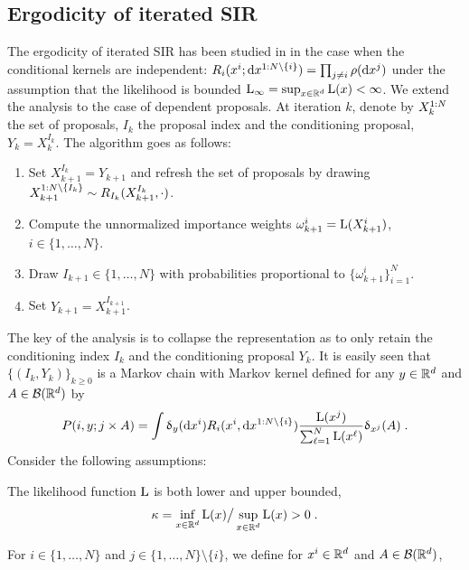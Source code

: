 \subsection{Ergodicity of iterated SIR}
\label{sup:sec:ergodicity}
The ergodicity of iterated SIR has been studied in \cite{andrieu2018uniform} in the case when the conditional kernels are independent: $R_i(x^i; \mathrm{d} x^{1:N \setminus \{i\}})= \prod_{j \neq i} \rho(\mathrm{d} x^j)$ under the assumption that the likelihood is bounded $\mathrm{L}_\infty= \sup_{x \in \mathbb{R}^d} \mathrm{L}(x) < \infty$. We extend the analysis to the case of dependent proposals. At iteration $k$, denote by $X_k^{1:N}$ the set of proposals, $I_k$ the proposal index and the conditioning proposal, $Y_k=X_k^{I_k}$. The algorithm goes as follows:
\begin{enumerate}
\item Set $X_{k+1}^{I_k}= Y_{k+1}$ and refresh the set of proposals by drawing $X_{k+1}^{1:N \setminus \{I_k\}} \sim R_{I_k}(X_{k+1}^{I_k},\cdot)$.
\item Compute the unnormalized importance weights $\omega_{k+1}^i= \mathrm{L}(X_{k+1}^i)$, $i \in \{1,\dots,N\}$.
\item Draw $I_{k+1} \in \{1,\dots,N\}$ with probabilities proportional to $\{\omega_{k+1}^i \}_{i=1}^N$.
\item Set $Y_{k+1}= X_{k+1}^{I_{k+1}}$.
\end{enumerate}
The key of the analysis is to collapse the representation as to  only retain the conditioning index $I_k$ and the conditioning proposal $Y_k$. It is easily seen that $\{(I_k,Y_k) \}_{k \geq 0}$ is a Markov chain with Markov kernel defined for any $y \in \mathbb{R}^d$ and $A \in \mathcal{B}(\mathbb{R}^d)$ by
\begin{equation}
\label{eq:kernel-marginal}
P(i,y; j \times A)=  \int \updelta_y(\mathrm{d} x^i) R_i(x^i, \mathrm{d} x^{1:N \setminus \{i\}}) \frac{\mathrm{L}(x^j)}{\sum_{\ell=1}^N \mathrm{L}(x^\ell)} \updelta_{x^j}(A) \;.
\end{equation}
Consider the following assumptions:
\begin{assumption}
\label{assum:likelihood-bounded}
The likelihood function $\mathrm{L}$ is both lower and upper bounded, \ie\
\begin{equation}
\label{eq:definition-rho}
\kappa= \inf_{x \in \mathbb{R}^d} \mathrm{L}(x) \big/ \sup_{x \in \mathbb{R}^d} \mathrm{L}(x) > 0 \;.
\end{equation}
\end{assumption}
For $i \in \{1,\dots,N\}$ and $j \in \{1,\dots,N\} \setminus \{i\}$, we define for $x^i \in \mathbb{R}^d$ and $A \in \mathcal{B}(\mathbb{R}^d)$,
